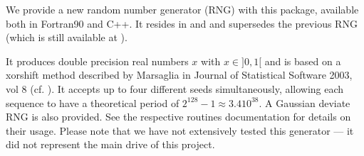 \documentclass[12pt,twoside]{article}
\begin{document}
We provide a new random number generator (RNG) with this package, available both
in Fortran90 and C++. 
It resides in 
and 
and supersedes the previous RNG (which is still available at 
). 

It produces double precision real numbers $x$ with $x\in]0,1[$ and is based 
on a xorshift method described by Marsaglia in 
Journal of Statistical Software 2003, vol 8
(cf. ).
It accepts up to four different seeds simultaneously, allowing each sequence to
have a
theoretical period of $2^{128}-1 \approx 3.4 10^{38}$. A Gaussian deviate RNG is
also provided. See the respective routines documentation for details on their usage.
Please note that we have not extensively tested this generator 
--- it did not represent the main drive of this project.



\newpage
\end{document}
